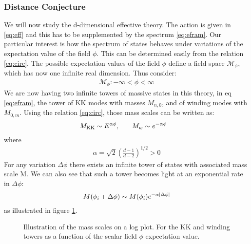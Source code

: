 \subsubsection{Distance Conjecture}
We will now study the d-dimensional effective theory. The action is given in \ref{eq:eff} and this has to be supplemented by the spectrum \ref{eq:efram}. Our particular interest is how the spectrum of states behaves under variations of the expectation value of the field $\phi$. This can be determined easily from the relation \ref{eq:circ}. The possible expectation values of the field $\phi$ define a field space $\mathcal{M}_{\phi}$, which has now one infinite real dimension. Thus consider:
\begin{align}
    \mathcal{M}_{\phi} : -\infty < \phi < \infty
\end{align}
We are now having two infinite towers of massive states in this theory, in eq \ref{eq:efram}, the tower of KK modes with masses $M_{n,0}$, and of winding modes with $M_{0,m}$. Using the relation \ref{eq:circ}, those mass scales can be written as:
\begin{align}
    M_{\text{KK}} \sim E^{\alpha\phi}, & \qq{} M_{w} \sim e^{-\alpha \phi}
\end{align}
where
\begin{align}
    \alpha = \sqrt{2} (\frac{d-1}{d-2})^{1/2} > 0
\end{align}
For any variation $\Delta \phi$ there exists an infinite tower of states with associated mass scale M. We can also see that such a tower becomes light at an exponential rate in $\Delta \phi$:
\begin{align}
    \label{eq:mass}
    M(\phi_{i} + \Delta \phi) \sim M(\phi _{i})e^{-\alpha \abs{\Delta \phi}}
\end{align}
as illustrated in figure \ref{fig:dual}.
\begin{figure}
    \centering
    \caption{Illustration of the mass scales on a log plot. For the KK and winding towers as a function of the scalar field $\phi$ expectation value.}
    \label{fig:dual}
\end{figure}
